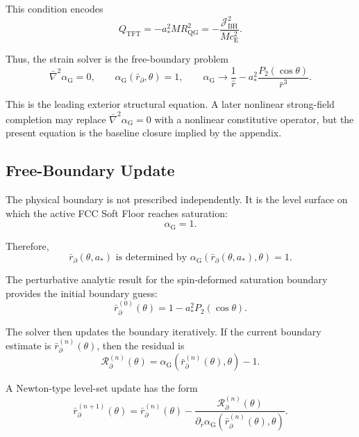 This condition encodes
\begin{equation}
    Q_{\mathrm{TFT}} = -a_\ast^2 M R_{\mathrm{QG}}^2 = -\frac{\mathcal{J}_{\mathrm{BH}}^2}{M c_{\mathrm{E}}^2}.
\end{equation}

Thus, the strain solver is the free-boundary problem
\begin{equation}
    \boxed{ \bar{\nabla}^2\alpha_{\mathrm{G}}=0, \qquad \alpha_{\mathrm{G}}(\bar{r}_{\partial},\theta)=1, \qquad \alpha_{\mathrm{G}} \rightarrow \frac{1}{\bar{r}} - a_\ast^2 \frac{P_2(\cos\theta)}{\bar{r}^3}. }
\end{equation}

This is the leading exterior structural equation. A later nonlinear strong-field completion may replace $\bar{\nabla}^2\alpha_{\mathrm{G}}=0$ with a nonlinear constitutive operator, but the present equation is the baseline closure implied by the appendix.

\subsection{Free-Boundary Update}

The physical boundary is not prescribed independently. It is the level surface on which the active FCC Soft Floor reaches saturation:
\begin{equation}
    \alpha_{\mathrm{G}} = 1.
\end{equation}

Therefore,
\begin{equation}
    \boxed{ \bar{r}_{\partial}(\theta,a_\ast) \text{ is determined by } \alpha_{\mathrm{G}}(\bar{r}_{\partial}(\theta,a_\ast),\theta)=1. }
\end{equation}

The perturbative analytic result for the spin-deformed saturation boundary provides the initial boundary guess:
\begin{equation}
    \bar{r}_{\partial}^{(0)}(\theta) = 1 - a_\ast^2 P_2(\cos\theta).
\end{equation}

The solver then updates the boundary iteratively. If the current boundary estimate is $\bar{r}_{\partial}^{(n)}(\theta)$, then the residual is
\begin{equation}
    \mathcal{R}_{\partial}^{(n)}(\theta) = \alpha_{\mathrm{G}}(\bar{r}_{\partial}^{(n)}(\theta),\theta)-1.
\end{equation}

A Newton-type level-set update has the form
\begin{equation}
    \bar{r}_{\partial}^{(n+1)}(\theta) = \bar{r}_{\partial}^{(n)}(\theta) - \frac{ \mathcal{R}_{\partial}^{(n)}(\theta) }{ \partial_{\bar{r}}\alpha_{\mathrm{G}}(\bar{r}_{\partial}^{(n)}(\theta),\theta) }.
\end{equation}

